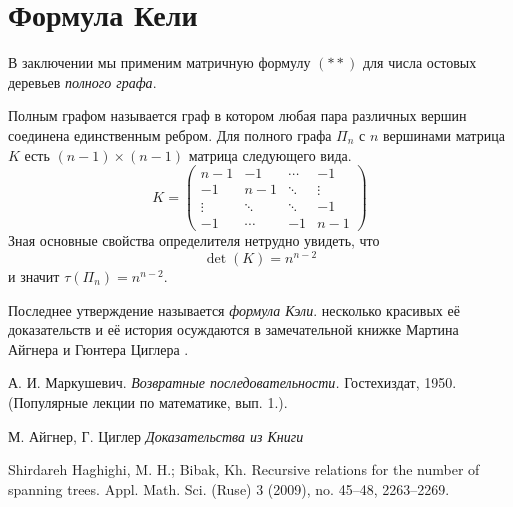 \documentclass{article}
\begin{document}
\section{Формула Кели}

В заключении мы применим матричную формулу $({*}{*})$ для числа остовых деревьев \emph{полного графа}.

Полным графом называется граф в котором любая пара различных вершин соединена единственным ребром.
Для полного графа $\Pi_n$ с $n$ вершинами матрица $K$ есть $(n-1)\times (n-1)$ матрица следующего вида.
\[
K=\left(
\begin{matrix}
n{-}1&-1&\cdots&-1
\\
-1&n{-}1&\ddots&\vdots
\\
\vdots&\ddots&\ddots&-1
\\
-1&\cdots&-1&n{-}1
\end{matrix}
\right)
\]
Зная основные свойства определителя нетрудно увидеть, что 
\[\det(K)=n^{n-2}\] и значит $\tau(\Pi_n)=n^{n-2}$.

Последнее утверждение называется \emph{формула Кэли}.
несколько красивых её доказательств и её история осуждаются в замечательной книжке Мартина Айгнера и Гюнтера Циглера \cite[Глава 30]{aigner-ziegler}.


\begin{thebibliography}{52}
А. И. Маркушевич. 
\emph{Возвратные последовательности.} 
Гостехиздат, 1950. (Популярные лекции по математике, вып. 1.).

 М. Айгнер, Г. Циглер \emph{Доказательства из Книги}

 Shirdareh Haghighi, M. H.; Bibak, Kh.
Recursive relations for the number of spanning trees. 
Appl. Math. Sci. (Ruse) 3 (2009), no. 45--48, 2263--2269. 
\end{thebibliography}
\end{document}

